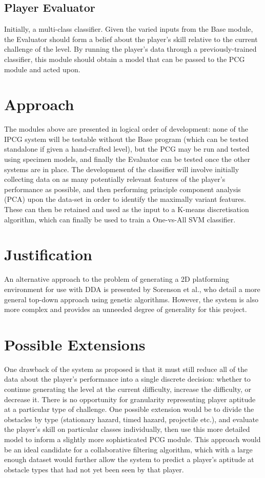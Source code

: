 \documentclass[a4paper,oneside,12pt,openany]{memoir}
\begin{document}
\subsection{Player Evaluator}
Initially, a multi-class classifier. Given the varied inputs from the Base module, the Evaluator should form a belief about the player's skill relative to the current challenge of the level. By running the player's data through a previously-trained classifier, this module should obtain a model that can be passed to the PCG module and acted upon.
 \section{Approach}
The modules above are presented in logical order of development: none of the IPCG system will be testable without the Base program (which can be tested standalone if given a hand-crafted level), but the PCG may be run and tested using specimen models, and finally the Evaluator can be tested once the other systems are in place.
 The development of the classifier will involve initially collecting data on as many potentially relevant features of the player's performance as possible, and then performing principle component analysis (PCA) upon the data-set in order to identify the maximally variant features. These can then be retained and used as the input to a K-means discretisation algorithm, which can finally be used to train a One-vs-All SVM classifier. 
 \section{Justification}
An alternative approach to the problem of generating a 2D platforming environment for use with DDA is presented by Sorenson et al.\cite{5940995}, who detail a more general top-down approach using genetic algorithms. However, the system is also more complex and provides an unneeded degree of generality for this project. 
 
\section{Possible Extensions}
One drawback of the system as proposed is that it must still reduce all of the data about the player's performance into a single discrete decision: whether to continue generating the level at the current difficulty, increase the difficulty, or decrease it. There is no opportunity for granularity representing player aptitude at a particular type of challenge. One possible extension would be to divide the obstacles by type (stationary hazard, timed hazard, projectile etc.), and evaluate the player's skill on particular classes individually, then use this more detailed model to inform a slightly more sophisticated PCG module. This approach would be an ideal candidate for a collaborative filtering algorithm, which with a large enough dataset would further allow the system to predict a player's aptitude at obstacle types that had not yet been seen by that player.
\end{document}
